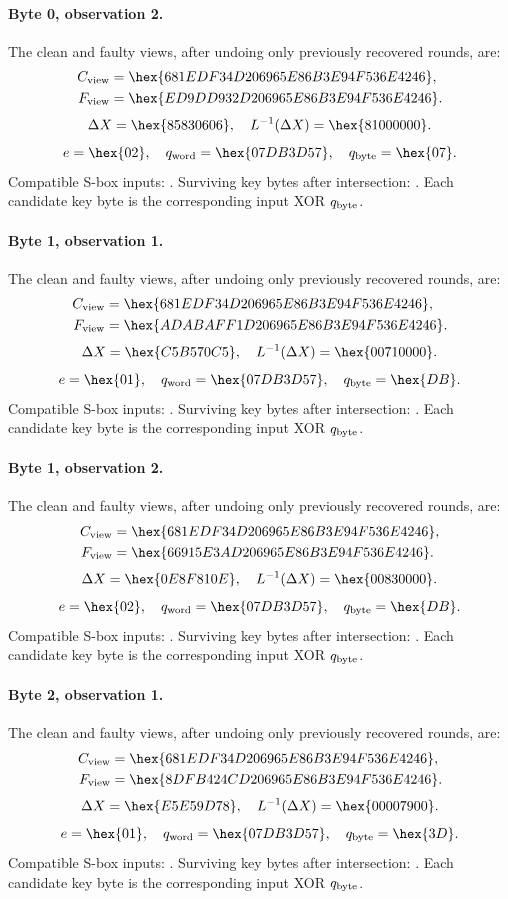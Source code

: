 \paragraph{Byte 0, observation 2.}
The clean and faulty views, after undoing only previously recovered rounds, are:
\[\begin{aligned}C_{\rm view}&=\hex{681EDF34D206965E86B3E94F536E4246},\\F_{\rm view}&=\hex{ED9DD932D206965E86B3E94F536E4246}.\end{aligned}\]
\[\Delta X=\hex{85830606},\quad L^{-1}(\Delta X)=\hex{81000000}.\]
\[e=\hex{02},\quad q_{\rm word}=\hex{07DB3D57},\quad q_{\rm byte}=\hex{07}.\]
Compatible S-box inputs: . Surviving key bytes after intersection: . Each candidate key byte is the corresponding input XOR $q_{\rm byte}$.
\paragraph{Byte 1, observation 1.}
The clean and faulty views, after undoing only previously recovered rounds, are:
\[\begin{aligned}C_{\rm view}&=\hex{681EDF34D206965E86B3E94F536E4246},\\F_{\rm view}&=\hex{ADABAFF1D206965E86B3E94F536E4246}.\end{aligned}\]
\[\Delta X=\hex{C5B570C5},\quad L^{-1}(\Delta X)=\hex{00710000}.\]
\[e=\hex{01},\quad q_{\rm word}=\hex{07DB3D57},\quad q_{\rm byte}=\hex{DB}.\]
Compatible S-box inputs: . Surviving key bytes after intersection: . Each candidate key byte is the corresponding input XOR $q_{\rm byte}$.
\paragraph{Byte 1, observation 2.}
The clean and faulty views, after undoing only previously recovered rounds, are:
\[\begin{aligned}C_{\rm view}&=\hex{681EDF34D206965E86B3E94F536E4246},\\F_{\rm view}&=\hex{66915E3AD206965E86B3E94F536E4246}.\end{aligned}\]
\[\Delta X=\hex{0E8F810E},\quad L^{-1}(\Delta X)=\hex{00830000}.\]
\[e=\hex{02},\quad q_{\rm word}=\hex{07DB3D57},\quad q_{\rm byte}=\hex{DB}.\]
Compatible S-box inputs: . Surviving key bytes after intersection: . Each candidate key byte is the corresponding input XOR $q_{\rm byte}$.
\paragraph{Byte 2, observation 1.}
The clean and faulty views, after undoing only previously recovered rounds, are:
\[\begin{aligned}C_{\rm view}&=\hex{681EDF34D206965E86B3E94F536E4246},\\F_{\rm view}&=\hex{8DFB424CD206965E86B3E94F536E4246}.\end{aligned}\]
\[\Delta X=\hex{E5E59D78},\quad L^{-1}(\Delta X)=\hex{00007900}.\]
\[e=\hex{01},\quad q_{\rm word}=\hex{07DB3D57},\quad q_{\rm byte}=\hex{3D}.\]
Compatible S-box inputs: . Surviving key bytes after intersection: . Each candidate key byte is the corresponding input XOR $q_{\rm byte}$.
